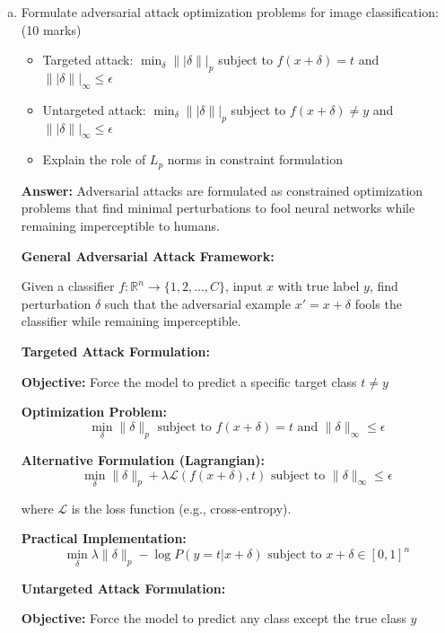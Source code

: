 \documentclass[12pt]{article}
\newcommand{\answer}[1]{{\color{answercolor}\textbf{Answer:} #1}}
\newcommand{\explanation}[1]{{\color{explanationcolor}#1}}
\begin{document}
\begin{enumerate}[(a)]
    \item Formulate adversarial attack optimization problems for image classification: \hfill (10 marks)
    \begin{itemize}
        \item Targeted attack: $\min_{\delta} \||\delta\||_p$ subject to $f(x + \delta) = t$ and $\||\delta\||_\infty \leq \epsilon$
        \item Untargeted attack: $\min_{\delta} \||\delta\||_p$ subject to $f(x + \delta) \neq y$ and $\||\delta\||_\infty \leq \epsilon$
        \item Explain the role of $L_p$ norms in constraint formulation
    \end{itemize}
    
    \answer{Adversarial attacks are formulated as constrained optimization problems that find minimal perturbations to fool neural networks while remaining imperceptible to humans.}
    
    \explanation{
    \textbf{General Adversarial Attack Framework:}
    
    Given a classifier $f: \mathbb{R}^n \rightarrow \{1, 2, ..., C\}$, input $x$ with true label $y$, find perturbation $\delta$ such that the adversarial example $x' = x + \delta$ fools the classifier while remaining imperceptible.
    
    \textbf{Targeted Attack Formulation:}
    
    \textbf{Objective:} Force the model to predict a specific target class $t \neq y$
    
    \textbf{Optimization Problem:}
    $$\min_{\delta} \|\delta\|_p \text{ subject to } f(x + \delta) = t \text{ and } \|\delta\|_\infty \leq \epsilon$$
    
    \textbf{Alternative Formulation (Lagrangian):}
    $$\min_{\delta} \|\delta\|_p + \lambda \mathcal{L}(f(x + \delta), t) \text{ subject to } \|\delta\|_\infty \leq \epsilon$$
    
    where $\mathcal{L}$ is the loss function (e.g., cross-entropy).
    
    \textbf{Practical Implementation:}
    $$\min_{\delta} \lambda \|\delta\|_p - \log P(y = t | x + \delta) \text{ subject to } x + \delta \in [0,1]^n$$
    
    \textbf{Untargeted Attack Formulation:}
    
    \textbf{Objective:} Force the model to predict any class except the true class $y$
    
}
\end{enumerate}
\end{document}
